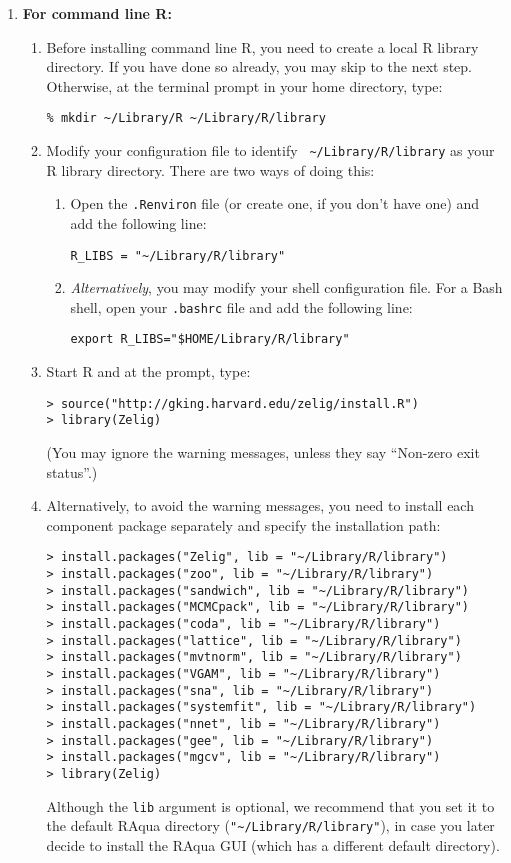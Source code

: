 \begin{enumerate}
\item {\bf For command line R:} 
  \begin{enumerate}
  \item Before installing command line R, you need to create a local R
    library directory.  If you have done so already, you may skip to
    the next step.  Otherwise, at the terminal prompt in your home
    directory, type:
\begin{verbatim}
% mkdir ~/Library/R ~/Library/R/library
\end{verbatim}
  \item Modify your configuration file to identify {\tt
      \~{}/Library/R/library} as your R library directory.  There are
    two ways of doing this:
    \begin{enumerate}
    \item Open the {\tt .Renviron} file (or create one, if you don't
      have one) and add the following line:
\begin{verbatim} 
R_LIBS = "~/Library/R/library"
\end{verbatim}
    \item {\it Alternatively}, you may modify your shell configuration
      file.  For a Bash shell, open your {\tt .bashrc} file and add
      the following line:
\begin{verbatim}
export R_LIBS="$HOME/Library/R/library"
\end{verbatim} %
      \end{enumerate}
    \item Start R and at the prompt, type:
\begin{verbatim}
> source("http://gking.harvard.edu/zelig/install.R")
> library(Zelig)
\end{verbatim}
(You may ignore the warning messages, unless they say ``Non-zero exit 
status''.)
\item Alternatively, to avoid the warning messages, you need to install 
each component package separately and specify the installation path:
\begin{verbatim}
> install.packages("Zelig", lib = "~/Library/R/library")
> install.packages("zoo", lib = "~/Library/R/library")
> install.packages("sandwich", lib = "~/Library/R/library")
> install.packages("MCMCpack", lib = "~/Library/R/library")
> install.packages("coda", lib = "~/Library/R/library")
> install.packages("lattice", lib = "~/Library/R/library")
> install.packages("mvtnorm", lib = "~/Library/R/library")
> install.packages("VGAM", lib = "~/Library/R/library")
> install.packages("sna", lib = "~/Library/R/library")
> install.packages("systemfit", lib = "~/Library/R/library")
> install.packages("nnet", lib = "~/Library/R/library")
> install.packages("gee", lib = "~/Library/R/library")
> install.packages("mgcv", lib = "~/Library/R/library")
> library(Zelig)
\end{verbatim}
      Although the {\tt lib} argument is optional, we recommend that
      you set it to the default RAqua directory
      (\verb|"~/Library/R/library"|), in case you later decide to
      install the RAqua GUI (which has a different default directory).
      \end{enumerate}
\end{enumerate}
  
